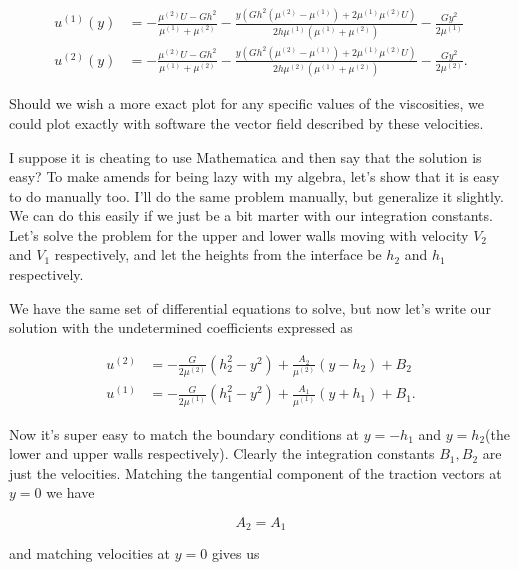 \begin{align}\label{eqn:continuumProblemSet2:840}
u^{(1)}(y) &= -\frac{\mu^{(2)} U -G h^2}{\mu^{(1)}+\mu^{(2)}}-\frac{y \left(G h^2 (\mu^{(2)} -\mu^{(1)}) +2 \mu^{(1)} \mu^{(2)} U \right)}{2 h \mu^{(1)} \left(\mu^{(1)}+\mu^{(2)}\right)}-\frac{G y^2}{2 \mu^{(1)}} \\
u^{(2)}(y) &= -\frac{\mu^{(2)} U -G h^2}{\mu^{(1)}+\mu^{(2)}}-\frac{y \left(G h^2 (\mu^{(2)} -\mu^{(1)}) +2 \mu^{(1)} \mu^{(2)} U \right)}{2 h \mu^{(2)} \left(\mu^{(1)}+\mu^{(2)}\right)}-\frac{G y^2}{2 \mu^{(2)}}.
\end{align}

Should we wish a more exact plot for any specific values of the viscosities, we could plot exactly with software the vector field described by these velocities.

I suppose it is cheating to use Mathematica and then say that the solution is easy?  To make amends for being lazy with my algebra, let's show that it is easy to do manually too.  I'll do the same problem manually, but generalize it slightly.  We can do this easily if we just be a bit marter with our integration constants.  Let's solve the problem for the upper and lower walls moving with velocity $V_2$ and $V_1$ respectively, and let the heights from the interface be $h_2$ and $h_1$ respectively.  %
%

We have the same set of differential equations to solve, but now let's write our solution with the undetermined coefficients expressed as

\begin{align}\label{eqn:continuumProblemSet2:n}
u^{(2)} &= -\frac{G}{2 \mu^{(2)}}\left( h_2^2 - y^2 \right) + \frac{A_2}{\mu^{(2)}} (y - h_2) + B_2 \\
u^{(1)} &= -\frac{G}{2 \mu^{(1)}}\left( h_1^2 - y^2 \right) + \frac{A_1}{\mu^{(1)}} (y + h_1) + B_1.
\end{align}

Now it's super easy to match the boundary conditions at $y = -h_1$ and $y = h_2$(the lower and upper walls respectively).  Clearly the integration constants $B_1,B_2$ are just the velocities.  Matching the tangential component of the traction vectors at $y = 0$ we have

\begin{equation}\label{eqn:continuumProblemSet2:n}
A_2 = A_1
\end{equation}

and matching velocities at $y = 0$ gives us

